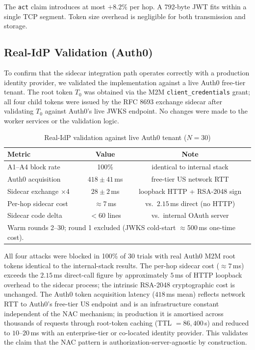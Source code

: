 \documentclass[journal]{IEEEtran}
\begin{document}
The \texttt{act} claim introduces at most $+8.2\%$ per hop. A 792-byte JWT
fits within a single TCP segment. Token size overhead is negligible for both
transmission and storage.


\subsection{Real-IdP Validation (Auth0)}
\label{sec:auth0_validation}

To confirm that the sidecar integration path operates correctly with a
production identity provider, we validated the implementation against a live
Auth0 free-tier tenant. The root token $T_0$ was obtained via the M2M
\texttt{client\_credentials} grant; all four child tokens were issued by the
RFC 8693 exchange sidecar after validating $T_0$ against Auth0's live JWKS
endpoint. No changes were made to the worker services or the validation logic.

\begin{table}[h]
\caption{Real-IdP validation against live Auth0 tenant ($N=30$)}
\label{tab:auth0}
\centering
\footnotesize
\setlength{\tabcolsep}{4pt}
\begin{tabular}{lcc}
\toprule
\textbf{Metric} & \textbf{Value} & \textbf{Note} \\
\midrule
A1--A4 block rate    & 100\%              & identical to internal stack \\
Auth0 acquisition    & $418 \pm 41$\,ms   & free-tier US network RTT \\
Sidecar exchange ×4  & $28 \pm 2$\,ms     & loopback HTTP + RSA-2048 sign \\
Per-hop sidecar cost & $\approx 7$\,ms    & vs.\ $2.15$\,ms direct (no HTTP) \\
Sidecar code delta   & $<60$ lines        & vs.\ internal OAuth server \\
\bottomrule
\multicolumn{3}{l}{\scriptsize Warm rounds 2--30; round 1 excluded (JWKS cold-start
  $\approx$500\,ms one-time cost).}
\end{tabular}
\end{table}

All four attacks were blocked in 100\% of 30 trials with real Auth0 M2M root
tokens identical to the internal-stack results. The per-hop sidecar cost
($\approx 7$\,ms) exceeds the $2.15$\,ms direct-call figure by approximately
$5$\,ms of HTTP loopback overhead to the sidecar process; the intrinsic
RSA-2048 cryptographic cost is unchanged. The Auth0 token acquisition latency
($418$\,ms mean) reflects network RTT to Auth0's free-tier US endpoint and is
an infrastructure constant independent of the NAC mechanism; in production it is
amortised across thousands of requests through root-token caching (TTL
$=86{,}400$\,s) and reduced to $10$--$20$\,ms with an enterprise-tier or
co-located identity provider. This validates the claim that the NAC pattern is
authorization-server-agnostic by construction.
\end{document}
